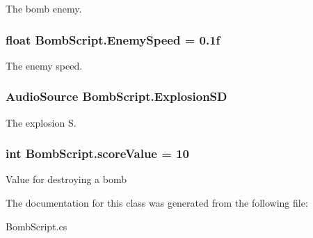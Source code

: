 The bomb enemy. 

\hypertarget{classBombScript_afba19f8bfc4dcd938590b616b81de052}{
\subsubsection[{Enemy\-Speed}]{\setlength{\rightskip}{0pt plus 5cm}float Bomb\-Script.\-Enemy\-Speed = 0.\-1f}}\label{classBombScript_afba19f8bfc4dcd938590b616b81de052}


The enemy speed. 

\hypertarget{classBombScript_a1c1f970bb78dc842d25b57d37c963c0e}{
\subsubsection[{Explosion\-S\-D}]{\setlength{\rightskip}{0pt plus 5cm}Audio\-Source Bomb\-Script.\-Explosion\-S\-D}}\label{classBombScript_a1c1f970bb78dc842d25b57d37c963c0e}


The explosion S. 

\hypertarget{classBombScript_ada41bfc1e2a7975b73dc796855d22199}{
\subsubsection[{score\-Value}]{\setlength{\rightskip}{0pt plus 5cm}int Bomb\-Script.\-score\-Value = 10}}\label{classBombScript_ada41bfc1e2a7975b73dc796855d22199}


Value for destroying a bomb 



The documentation for this class was generated from the following file\-:\begin{DoxyCompactItemize}
\item 
Bomb\-Script.\-cs\end{DoxyCompactItemize}
